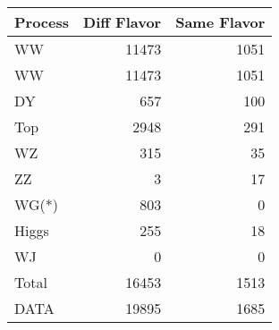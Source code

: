 \begin{table}[ht]
	\centering
\begin{tabular}{lrr}

Process &  Diff Flavor &  Same Flavor \\
		\hline
     WW &        11473 &         1051 \\
     WW &        11473 &         1051 \\
     DY &          657 &          100 \\
    Top &         2948 &          291 \\
     WZ &          315 &           35 \\
     ZZ &            3 &           17 \\
  WG(*) &          803 &            0 \\
  Higgs &          255 &           18 \\
     WJ &            0 &            0 \\
\hline
  Total &        16453 &         1513 \\
   DATA &        19895 &         1685 \\


\end{tabular}

\end{table}
